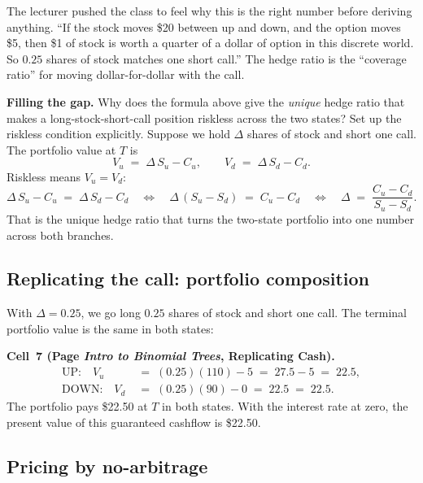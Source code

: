 The lecturer pushed the class to feel why this is the right number
before deriving anything. ``If the stock moves \$20 between up and
down, and the option moves \$5, then \$1 of stock is worth a quarter
of a dollar of option in this discrete world. So $0.25$ shares of
stock matches one short call.'' The hedge ratio is the ``coverage
ratio'' for moving dollar-for-dollar with the call.

\begin{tipblock}
\textbf{Filling the gap.} Why does the formula above give the
\emph{unique} hedge ratio that makes a long-stock-short-call
position riskless across the two states? Set up the riskless
condition explicitly. Suppose we hold $\Delta$ shares of stock and
short one call. The portfolio value at $T$ is
\[
  V_u \;=\; \Delta\,S_u - C_u, \qquad V_d \;=\; \Delta\,S_d - C_d.
\]
Riskless means $V_u = V_d$:
\[
  \Delta\,S_u - C_u \;=\; \Delta\,S_d - C_d
  \quad\Longleftrightarrow\quad
  \Delta\,(S_u - S_d) \;=\; C_u - C_d
  \quad\Longleftrightarrow\quad
  \Delta \;=\; \frac{C_u - C_d}{S_u - S_d}.
\]
That is the unique hedge ratio that turns the two-state portfolio
into one number across both branches.
\end{tipblock}

\subsection{Replicating the call: portfolio composition}\label{L8-sec:replicate}

With $\Delta = 0.25$, we go long $0.25$ shares of stock and short
one call. The terminal portfolio value is the same in both states:

\begin{keyblock}
\textbf{Cell~7 (Page \emph{Intro to Binomial Trees}, Replicating
Cash).}
\begin{align*}
  \text{UP:}\quad   V_u &\;=\; (0.25)(110) - 5 \;=\; 27.5 - 5 \;=\; 22.5, \\
  \text{DOWN:}\quad V_d &\;=\; (0.25)(90)  - 0 \;=\; 22.5 \;=\; 22.5.
\end{align*}
The portfolio pays \$22.50 at $T$ in both states. With the interest
rate at zero, the present value of this guaranteed cashflow is
\$22.50.
\end{keyblock}

\subsection{Pricing by no-arbitrage}\label{L8-sec:pricena}

